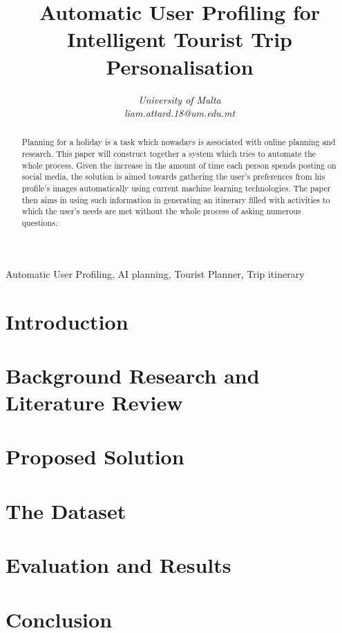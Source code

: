 \documentclass[conference]{IEEEtran}
\title{Automatic User Profiling for Intelligent Tourist Trip Personalisation}
\author{\IEEEauthorblockN{Liam Attard [0299300L] }
\IEEEauthorblockA{Department of Artificial Intelligence}
\textit{University of Malta}\\
\textit{liam.attard.18@um.edu.mt}}
\begin{document}
  \maketitle

  \begin{abstract}
    Planning for a holiday is a task which nowadays is associated with
    online planning and research. This paper will construct together a
    system which tries to automate the whole process. Given the
    increase in the amount of time each person spends posting on
    social media, the solution is aimed towards gathering the user’s
    preferences from his profile’s images automatically using current
    machine learning technologies. The paper then aims in using such
    information in generating an itinerary filled with activities to
    which the user’s needs are met without the whole process of asking
    numerous questions.
  \end{abstract}

  \begin{IEEEkeywords}
    Automatic User Profiling, AI planning, Tourist Planner, Trip itinerary 

  \end{IEEEkeywords}

  \section{Introduction}
    

  \section{Background Research and Literature Review}
    

  \section{Proposed Solution}
    \label{Proposed}
    

  \section{The Dataset}
    \label{Dataset}
    

  \section{Evaluation and Results}
  \label{Evaluation}
    

  \section{Conclusion}
  \label{Conclusion}
    

  
  
\end{document}

